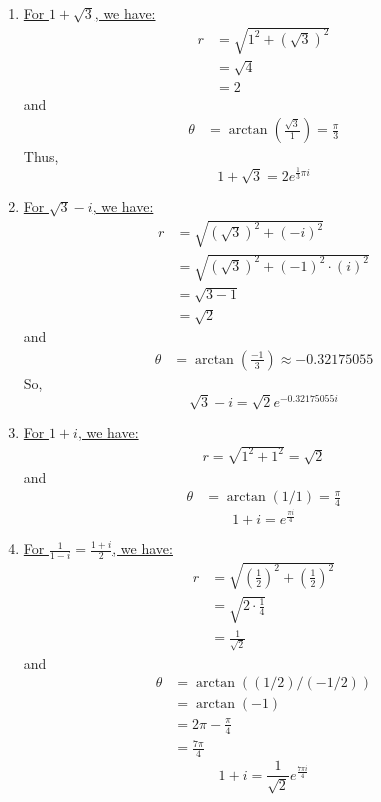 \documentclass{article}
\begin{document}
\begin{enumerate}[label=(\alph*)]
  \item \underline{For $1 + \sqrt{3}$, we have:}
  \begin{align*}
    r &= \sqrt{1^2 + (\sqrt{3})^2} \\
    &= \sqrt{4} \\
    &= 2
  \end{align*}
  and 
  \begin{align*}
    \theta &= \arctan\left( \frac{\sqrt{3}}{1} \right) = \frac{\pi}{3}
  \end{align*}
  Thus, 
  \[ \boxed{ 1 + \sqrt{3} = 2 e^{\frac{1}{3} \pi i}} \]
  
  \vskip 0.5cm
  \item \underline{For $\sqrt{3} - i$, we have:}
  \begin{align*}
    r &= \sqrt{(\sqrt{3})^2 + (-i)^2} \\
    &= \sqrt{\left(\sqrt{3}\right)^2 + (-1)^2\cdot(i)^2} \\
    &= \sqrt{3 - 1} \\
    &= \sqrt{2}
  \end{align*}
  and
  \begin{align*}
    \theta &= \arctan\left( \frac{-1}{3} \right) \approx -0.32175055
  \end{align*}
  So, 
  \[ \boxed{\sqrt{3} - i = \sqrt{2}e^{-0.32175055 i}} \]


  \vskip 0.5cm
  \item \underline{For $1 + i$, we have:}
  \begin{align*}
    r = \sqrt{1^2 + 1^2} = \sqrt{2}
  \end{align*}
  and
  \begin{align*}
    \theta &= \arctan(1/1) = \frac{\pi}{4}
  \end{align*}
  \[ \boxed{1 + i = e^{\frac{\pi i }{4}}} \]

  \vskip 0.5cm
  \item \underline{For $\frac{1}{1-i} = \frac{1+i}{2}$, we have:}
  \begin{align*}
    r &= \sqrt{\left(\frac{1}{2}\right)^2 + \left(\frac{1}{2}\right)^2} \\
    &= \sqrt{2 \cdot \frac{1}{4}} \\
    &= \frac{1}{\sqrt{2}}
  \end{align*}
  and
  \begin{align*}
    \theta &= \arctan((1/2)/(-1/2)) \\
    &= \arctan(-1) \\
    &= 2\pi-\frac{\pi}{4} \\
    &= \frac{7\pi}{4}
  \end{align*}
  \[ \boxed{1 + i = \frac{1}{\sqrt{2}} e^{\frac{7\pi i }{4}}} \]
\end{enumerate}
\end{document}
